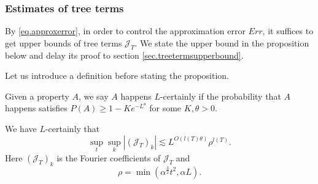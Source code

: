\subsubsection{Estimates of tree terms} By \eqref{eq.approxerror}, in order to control the approximation error $Err$, it suffices to get upper bounds of tree terms $\mathcal{J}_T$. We state the upper bound in the proposition below and delay its proof to section \ref{sec.treetermsupperbound}.

Let us introduce a definition before stating the proposition.

\begin{defn}
Given a property $A$, we say $A$ happens $L$-certainly if the probability that $A$ happens satisfies $P(A)\ge 1-Ke^{-L^\theta}$ for some $K, \theta>0$.
\end{defn}

\begin{prop}\label{prop.treetermsupperbound}
We have $L$-certainly that 
\begin{equation}
 \sup_t\sup_k |(\mathcal{J}_T)_k|\lesssim L^{O(l(T)\theta)} \rho^{l(T)}.
\end{equation}
Here $(\mathcal{J}_T)_k$ is the Fourier coefficients of $\mathcal{J}_T$ and 
\begin{equation}
 \rho=\min(\alpha^{\frac{3}{2}}t^2,\alpha L).
\end{equation}
\end{prop}